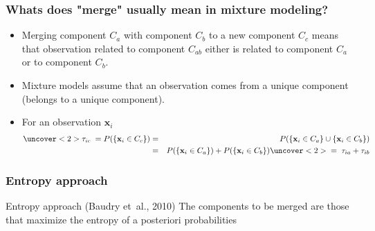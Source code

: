 \begin{frame}
\frametitle{Whats does "merge" usually mean  in mixture modeling?}
\begin{itemize}
\item Merging component $C_a$ with component $C_b$ to a new component $C_c$ means that observation related to component $C_{ab}$ either is related to component $C_a$ or to component $C_b$.
\item Mixture models assume that an observation comes from a unique component (belongs to a unique component).
\item For an observation $\textbf{x}_i$ 
\begin{eqnarray*} 
\uncover<2>{ \tau_{i c}  \;=\;} P( \{ \textbf{x}_i \in C_{c} \})  &=& P( \{ \textbf{x}_i \in C_{a} \} \cup \{ \textbf{x}_i \in C_{b} \} ) \\
&=& P( \{ \textbf{x}_i \in C_{a} \}) + P( \{ \textbf{x}_i \in C_{b} \} )  \uncover<2>{ \;=\; \tau_{i a} + \tau_{i b} }
\end{eqnarray*} 
\end{itemize}
\end{frame}

\begin{frame}[t]
\frametitle{Entropy approach}
\begin{block}{Entropy approach (Baudry et~al., 2010)}
The components to be merged are those that maximize the entropy of a posteriori probabilities
\end{block}
\small
{}
\end{frame}

